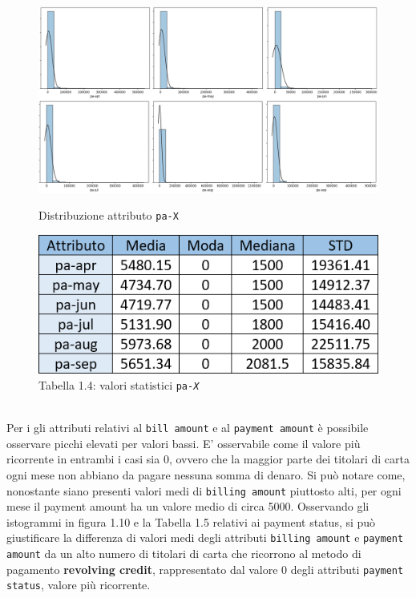\begin{figure}[!htb]
  \includegraphics[width=\linewidth]{img/pa-distribution.png}
  \caption{Distribuzione attributo \texttt{pa-X}}\label{pa-dist}
\endminipage\hfill
{}
  \includegraphics[width=\linewidth]{img/pa-stat.png}
\captionsetup{labelformat=empty}
\caption{Tabella 1.4: valori statistici \texttt{pa-\textit{X}}}
\label{pa-stat}
\endminipage\hfill
\end{figure}
\mbox{}\\
Per i gli attributi relativi al \texttt{bill amount} e al \texttt{payment amount} \`e possibile osservare picchi elevati per valori bassi. E' osservabile come il valore pi\`u ricorrente in entrambi i casi sia 0, ovvero che la maggior parte dei titolari di carta ogni mese non abbiano da pagare nessuna somma di denaro. Si pu\`o notare come, nonostante siano presenti valori medi di \texttt{billing amount} piuttosto alti, per ogni mese il payment amount ha un valore medio di circa 5000. Osservando gli istogrammi in figura 1.10 e la Tabella 1.5 relativi ai payment status, si pu\`o giustificare la differenza di valori medi degli attributi \texttt{billing amount} e \texttt{payment amount} da un alto numero di titolari di carta che ricorrono al metodo di pagamento \textbf{revolving credit}, rappresentato dal valore 0 degli attributi \texttt{payment status}, valore pi\`u ricorrente.

